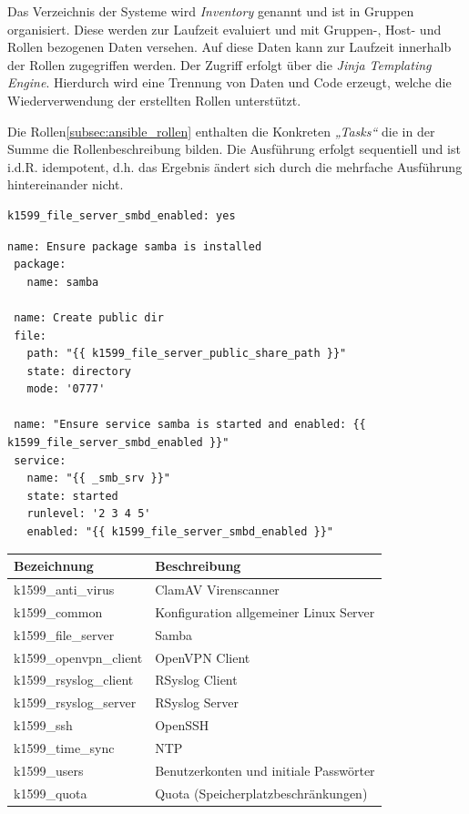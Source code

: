 Das Verzeichnis der Systeme wird \emph{Inventory} genannt und ist in Gruppen organisiert. Diese werden zur Laufzeit evaluiert und mit Gruppen-, Host- und Rollen bezogenen Daten versehen. Auf diese Daten kann zur Laufzeit innerhalb der Rollen zugegriffen werden. Der Zugriff erfolgt über die \textit{Jinja Templating Engine}. Hierdurch wird eine Trennung von Daten und Code erzeugt, welche die Wiederverwendung der erstellten Rollen unterstützt.

Die Rollen\ref{subsec:ansible_rollen} enthalten die Konkreten \emph{„Tasks“} die in der Summe die Rollenbeschreibung bilden. Die Ausführung erfolgt sequentiell und ist i.d.R. idempotent, d.h. das Ergebnis ändert sich durch die mehrfache Ausführung hintereinander nicht.

\begin{lstlisting}[label=code:public,caption=Auszug aus ansible/group\_vars/file\_server/public]
k1599_file_server_smbd_enabled: yes
\end{lstlisting}

\begin{lstlisting}[label=code:public2,caption=Auszug aus ansible/roles/k1599\_file\_server/tasks/main.yml]
 name: Ensure package samba is installed
 package:
   name: samba

 name: Create public dir
 file:
   path: "{{ k1599_file_server_public_share_path }}"
   state: directory
   mode: '0777'

 name: "Ensure service samba is started and enabled: {{ k1599_file_server_smbd_enabled }}"
 service:
   name: "{{ _smb_srv }}"
   state: started
   runlevel: '2 3 4 5'
   enabled: "{{ k1599_file_server_smbd_enabled }}"
\end{lstlisting}
\bigskip

\begin{minipage}{\textwidth}
\begin{center}
\begin{tabular}{lp{12cm}}
\toprule
Bezeichnung & Beschreibung \\
\midrule
k1599\_anti\_virus & ClamAV Virenscanner \\
k1599\_common & Konfiguration allgemeiner Linux Server \\
k1599\_file\_server & Samba \\
k1599\_openvpn\_client & OpenVPN Client \\
k1599\_rsyslog\_client & RSyslog Client \\
k1599\_rsyslog\_server & RSyslog Server \\
k1599\_ssh & OpenSSH \\
k1599\_time\_sync & NTP \\
k1599\_users & Benutzerkonten und initiale Passwörter \\
k1599\_quota & Quota (Speicherplatzbeschränkungen) \\
\bottomrule
\end{tabular}
\end{center}
\end{minipage}


